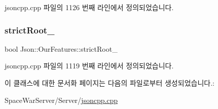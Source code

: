 jsoncpp.\+cpp 파일의 1126 번째 라인에서 정의되었습니다.

\mbox{\label{class_json_1_1_our_features_a2095f66a776c0a4ae6cc931a0c94242e}} 
\subsubsection{\texorpdfstring{strict\+Root\+\_\+}{strictRoot\_}}
{\footnotesize\ttfamily bool Json\+::\+Our\+Features\+::strict\+Root\+\_\+}



jsoncpp.\+cpp 파일의 1119 번째 라인에서 정의되었습니다.



이 클래스에 대한 문서화 페이지는 다음의 파일로부터 생성되었습니다.\+:\begin{DoxyCompactItemize}
\item 
Space\+War\+Server/\+Server/\hyperlink{jsoncpp_8cpp}{jsoncpp.\+cpp}\end{DoxyCompactItemize}
